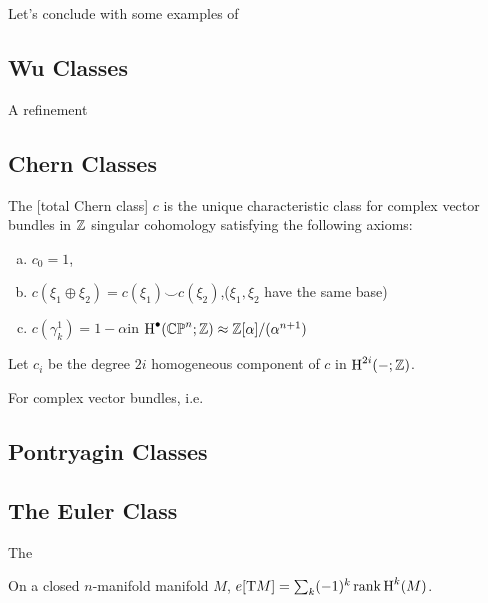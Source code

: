 Let's conclude with some examples of 
\begin{theorem}

\end{theorem}

\subsection{Wu Classes}

A refinement

\subsection{Chern Classes}

\begin{definition}
	The [total Chern class] $c$ is the unique characteristic class for complex vector bundles in $\mathbb{Z}$ singular cohomology satisfying the following axioms:
	\begin{enumerate}[(a)]
		\item $c_0=1$,
		\item $c(\xi_1\oplus \xi_2)=c(\xi_1)\smile c(\xi_2)$,\hfill ($\xi_1, \xi_2$ have the same base)
		\item $c(\gamma^1_k)=1-\alpha$\hfill in $\operatorname{H}^\bullet(\mathbb{CP}^n;\mathbb{Z})\approx \mathbb{Z}[\alpha]/(\alpha^{n+1})$
	\end{enumerate}
	Let $c_i$ be the degree $2i$ homogeneous component of $c$ in $\operatorname{H}^{2i}(-;\mathbb{Z})$.
\end{definition}

\begin{remark}

\end{remark}

For complex vector bundles, i.e. 

\subsection{Pontryagin Classes}\label{sec:pontryagin-classes}

\subsection{The Euler Class}\label{sec:euler-class}

\begin{definition}\label{def:euler-class}
	The 
\end{definition}

\begin{proposition}
	On a closed $n$-manifold manifold $M$, $e[\mathrm{T} M]=\sum_k (-1)^k \operatorname{rank} \operatorname{H}^k(M)$.
\end{proposition}

